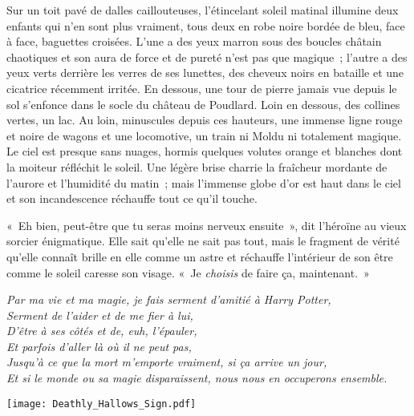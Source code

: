 Sur un toit pavé de dalles caillouteuses, l'étincelant soleil matinal illumine deux enfants qui n'en sont plus vraiment, tous deux en robe noire bordée de bleu, face à face, baguettes croisées.
L'une a des yeux marron sous des boucles châtain chaotiques et son aura de force et de pureté n'est pas que magique~; l'autre a des yeux verts derrière les verres de ses lunettes, des cheveux noirs en bataille et une cicatrice récemment irritée.
En dessous, une tour de pierre jamais vue depuis le sol s'enfonce dans le socle du château de Poudlard.
Loin en dessous, des collines vertes, un lac.
Au loin, minuscules depuis ces hauteurs, une immense ligne rouge et noire de wagons et une locomotive, un train ni Moldu ni totalement magique.
Le ciel est presque sans nuages, hormis quelques volutes orange et blanches dont la moiteur réfléchit le soleil.
Une légère brise charrie la fraîcheur mordante de l'aurore et l'humidité du matin~; mais l'immense globe d'or est haut dans le ciel et son incandescence réchauffe tout ce qu'il touche.

«~Eh bien, peut-être que tu seras moins nerveux ensuite~», dit l'héroïne au vieux sorcier énigmatique.
Elle sait qu'elle ne sait pas tout, mais le fragment de vérité qu'elle connaît brille en elle comme un astre et réchauffe l'intérieur de son être comme le soleil caresse son visage.
«~Je \emph{choisis} de faire ça, maintenant.~»

\emph{Par ma vie et ma magie, je fais serment d'amitié à Harry Potter,\\ Serment de l'aider et de me fier à lui,\\ D'être à ses côtés et de, euh, l'épauler,\\ Et parfois d'aller là où il ne peut pas,\\ Jusqu'à ce que la mort m'emporte vraiment, si ça arrive un jour,\\ Et si le monde ou sa magie disparaissent, nous nous en occuperons ensemble.}
\vspace*{\fill}
{
\begin{center}
\texttt{[image: Deathly\_Hallows\_Sign.pdf]}
\end{center}
}
\vspace*{\fill}
\clearpage

